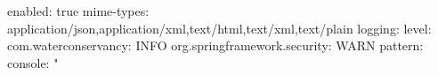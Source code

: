 enabled: true mime-types: application/json,application/xml,text/html,text/xml,text/plain logging: level: com.waterconservancy: INFO org.springframework.security: WARN pattern: console: "%
